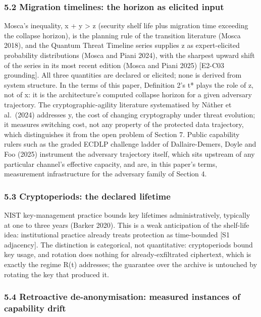 \documentclass[
  11pt,
]{article}
\begin{document}
\subsubsection{5.2 Migration timelines: the horizon as elicited
input}\label{migration-timelines-the-horizon-as-elicited-input}

Mosca's inequality, x + y \textgreater{} z (security shelf life plus
migration time exceeding the collapse horizon), is the planning rule of
the transition literature (Mosca 2018), and the Quantum Threat Timeline
series supplies z as expert-elicited probability distributions (Mosca
and Piani 2024), with the sharpest upward shift of the series in its
most recent edition (Mosca and Piani 2025) {[}E2-C03 grounding{]}. All
three quantities are declared or elicited; none is derived from system
structure. In the terms of this paper, Definition 2's t* plays the role
of z, not of x: it is the architecture's computed collapse horizon for a
given adversary trajectory. The cryptographic-agility literature
systematised by Näther et al.~(2024) addresses y, the cost of changing
cryptography under threat evolution; it measures switching cost, not any
property of the protected data trajectory, which distinguishes it from
the open problem of Section 7. Public capability rulers such as the
graded ECDLP challenge ladder of Dallaire-Demers, Doyle and Foo (2025)
instrument the adversary trajectory itself, which sits upstream of any
particular channel's effective capacity, and are, in this paper's terms,
measurement infrastructure for the adversary family of Section 4.

\subsubsection{5.3 Cryptoperiods: the declared
lifetime}\label{cryptoperiods-the-declared-lifetime}

NIST key-management practice bounds key lifetimes administratively,
typically at one to three years (Barker 2020). This is a weak
anticipation of the shelf-life idea: institutional practice already
treats protection as time-bounded {[}S1 adjacency{]}. The distinction is
categorical, not quantitative: cryptoperiods bound key usage, and
rotation does nothing for already-exfiltrated ciphertext, which is
exactly the regime R(t) addresses; the guarantee over the archive is
untouched by rotating the key that produced it.

\subsubsection{5.4 Retroactive de-anonymisation: measured instances of
capability
drift}\label{retroactive-de-anonymisation-measured-instances-of-capability-drift}
\end{document}
